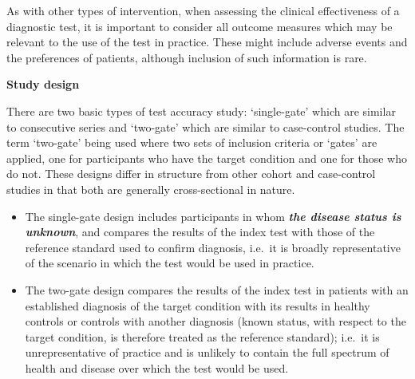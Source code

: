\documentclass[
  11pt,
  a4paper,
  DIV=11,
  numbers=noendperiod]{scrreprt}
\begin{document}
As with other types of intervention, when assessing the clinical
effectiveness of a diagnostic test, it is important to consider all
outcome measures which may be relevant to the use of the test in
practice. These might include adverse events and the preferences of
patients, although inclusion of such information is rare.

\textbf{Study design}

There are two basic types of test accuracy study: `single-gate' which
are similar to consecutive series and `two-gate' which are similar to
case-control studies. The term `two-gate' being used where two sets of
inclusion criteria or `gates' are applied, one for participants who have
the target condition and one for those who do not. These designs differ
in structure from other cohort and case-control studies in that both are
generally cross-sectional in nature.

\begin{itemize}
\item
  The single-gate design includes participants in whom \textbf{\emph{the
  disease status is unknown}}, and compares the results of the index
  test with those of the reference standard used to confirm diagnosis,
  i.e.~it is broadly representative of the scenario in which the test
  would be used in practice.
\item
  The two-gate design compares the results of the index test in patients
  with an established diagnosis of the target condition with its results
  in healthy controls or controls with another diagnosis (known status,
  with respect to the target condition, is therefore treated as the
  reference standard); i.e.~it is unrepresentative of practice and is
  unlikely to contain the full spectrum of health and disease over which
  the test would be used.
\end{itemize}
\end{document}
